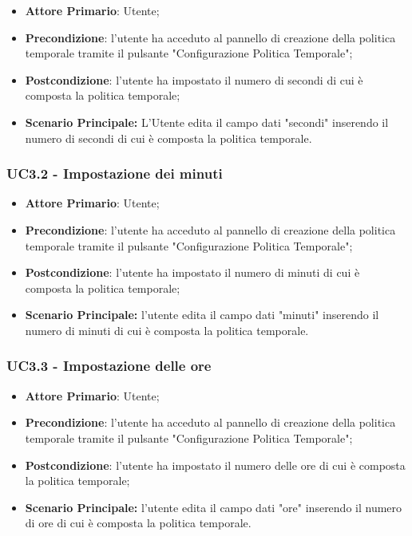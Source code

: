 \begin{itemize}
	\item \textbf{Attore Primario}: Utente;
	\item \textbf{Precondizione}: l'utente ha acceduto al pannello di creazione della politica temporale tramite il pulsante "Configurazione Politica Temporale";
	\item \textbf{Postcondizione}: l'utente ha impostato il numero di secondi di cui è composta la politica temporale;
	\item \textbf{Scenario Principale:} L'Utente edita il campo dati "secondi" inserendo il numero di secondi di cui è composta la politica temporale.
\end{itemize}

\subsubsection{UC3.2 - Impostazione dei minuti}\label{UC3.2}

\begin{itemize}
	\item \textbf{Attore Primario}: Utente;
	\item \textbf{Precondizione}: l'utente ha acceduto al pannello di creazione della politica temporale tramite il pulsante "Configurazione Politica Temporale";
	\item \textbf{Postcondizione}: l'utente ha impostato il numero di minuti di cui è composta la politica temporale;
	\item \textbf{Scenario Principale:} l'utente edita il campo dati "minuti" inserendo il numero di minuti di cui è composta la politica temporale.
\end{itemize}


\subsubsection{UC3.3 - Impostazione delle ore}\label{UC3.3}

\begin{itemize}
	\item \textbf{Attore Primario}: Utente;
	\item \textbf{Precondizione}: l'utente ha acceduto al pannello di creazione della politica temporale tramite il pulsante "Configurazione Politica Temporale";
	\item \textbf{Postcondizione}: l'utente ha impostato il numero delle ore di cui è composta la politica temporale;
	\item \textbf{Scenario Principale:} l'utente edita il campo dati "ore" inserendo il numero di ore di cui è composta la politica temporale.
\end{itemize}


